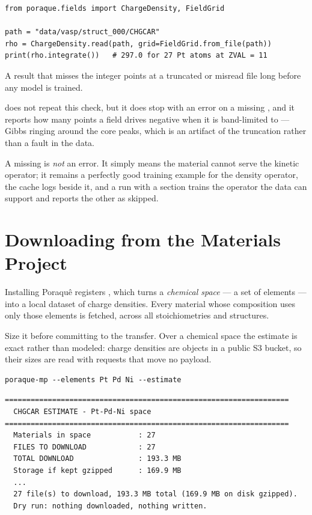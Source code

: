 \begin{lstlisting}
from poraque.fields import ChargeDensity, FieldGrid

path = "data/vasp/struct_000/CHGCAR"
rho = ChargeDensity.read(path, grid=FieldGrid.from_file(path))
print(rho.integrate())   # 297.0 for 27 Pt atoms at ZVAL = 11
\end{lstlisting}

A result that misses the integer points at a truncated or misread file long
before any model is trained.

 does not repeat this check, but it does stop with an error
on a missing , and it reports how many points a field drives
negative when it is band-limited to  --- Gibbs ringing
around the core peaks, which is an artifact of the truncation rather than a
fault in the data.

A missing  is \emph{not} an error. It simply means the material
cannot serve the kinetic operator; it remains a perfectly good training example
for the density operator, the cache logs \opt{[no TAUCAR]} beside it, and a run
with a  section trains the operator the data can support and
reports the other as skipped.

\section{Downloading from the Materials Project}
\label{sec:mp-download}

Installing Poraqu\^e registers , which turns a \emph{chemical
space} --- a set of elements --- into a local dataset of charge densities.
Every material whose composition uses only those elements is fetched, across
all stoichiometries and structures.

Size it before committing to the transfer. Over a chemical space the estimate
is exact rather than modeled: charge densities are objects in a public S3
bucket, so their sizes are read with  requests that move no payload.

\begin{lstlisting}
poraque-mp --elements Pt Pd Ni --estimate
\end{lstlisting}

\begin{lstlisting}
==================================================================
  CHGCAR ESTIMATE - Pt-Pd-Ni space
==================================================================
  Materials in space           : 27
  FILES TO DOWNLOAD            : 27
  TOTAL DOWNLOAD               : 193.3 MB
  Storage if kept gzipped      : 169.9 MB
  ...
  27 file(s) to download, 193.3 MB total (169.9 MB on disk gzipped).
  Dry run: nothing downloaded, nothing written.
\end{lstlisting}

